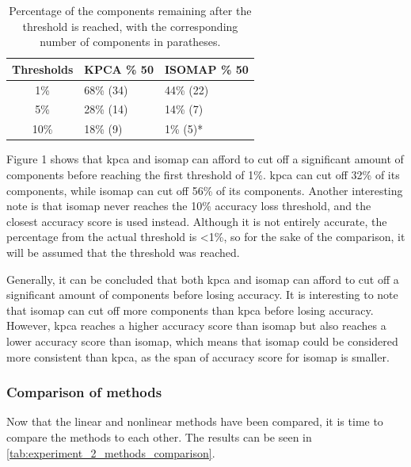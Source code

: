 \begin{table}[htb!]
    \centering
    \begin{tabular}{cp{}p{}}
        \toprule
        \textbf{Thresholds} & \textbf{KPCA \% 50} & \textbf{ISOMAP \% 50} \\
        \midrule
        1\%                 & 68\% (34)           & 44\% (22)             \\
        5\%                 & 28\% (14)           & 14\% (7)              \\
        10\%                & 18\% (9)            & 1\% (5)*              \\
        \bottomrule
    \end{tabular}
    \caption{Percentage of the components remaining after the threshold is reached, with the corresponding number of components in paratheses.}
    \label{tab:experiment_2_non_linear_methods_comparison}
\end{table}

Figure 1 shows that \gls{kpca} and \gls{isomap} can afford to cut off a significant amount of components before reaching the first threshold of 1\%. \gls{kpca} can cut off 32\% of its components, while \gls{isomap} can cut off 56\% of its components. Another interesting note is that \gls{isomap} never reaches the 10\% accuracy loss threshold, and the closest accuracy score is used instead. Although it is not entirely accurate, the percentage from the actual threshold is <1\%, so for the sake of the comparison, it will be assumed that the threshold was reached.

Generally, it can be concluded that both \gls{kpca} and \gls{isomap} can afford to cut off a significant amount of components before losing accuracy. It is interesting to note that \gls{isomap} can cut off more components than \gls{kpca} before losing accuracy. However, \gls{kpca} reaches a higher accuracy score than \gls{isomap} but also reaches a lower accuracy score than \gls{isomap}, which means that \gls{isomap} could be considered more consistent than kpca, as the span of accuracy score for \gls{isomap} is smaller.


\subsubsection{Comparison of methods}
Now that the linear and nonlinear methods have been compared, it is time to compare the methods to each other. The results can be seen in \autoref{tab:experiment_2_methods_comparison}.


